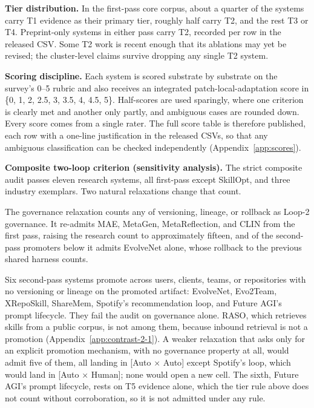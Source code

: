 \documentclass[
  11pt,
]{article}
\newcounter{none} %
\begin{document}
\textbf{Tier distribution.} In the first-pass core corpus, about a quarter of the systems carry T1 evidence as their primary tier, roughly half carry T2, and the rest T3 or T4. Preprint-only systems in either pass carry T2, recorded per row in the released CSV. Some T2 work is recent enough that its ablations may yet be revised; the cluster-level claims survive dropping any single T2 system.

\textbf{Scoring discipline.} Each system is scored substrate by substrate on the survey's 0--5 rubric and also receives an integrated patch-local-adaptation score in \{0, 1, 2, 2.5, 3, 3.5, 4, 4.5, 5\}. Half-scores are used sparingly, where one criterion is clearly met and another only partly, and ambiguous cases are rounded down. Every score comes from a single rater. The full score table is therefore published, each row with a one-line justification in the released CSVs, so that any ambiguous classification can be checked independently (Appendix~\ref{app:scores}).

\textbf{Composite two-loop criterion (sensitivity analysis).} The strict composite audit passes eleven research systems, all first-pass except SkillOpt, and three industry exemplars. Two natural relaxations change that count.

The governance relaxation counts any of versioning, lineage, or rollback as Loop-2 governance. It re-admits MAE, MetaGen, MetaReflection, and CLIN from the first pass, raising the research count to approximately fifteen, and of the second-pass promoters below it admits EvolveNet alone, whose rollback to the previous shared harness counts.

Six second-pass systems promote across users, clients, teams, or repositories with no versioning or lineage on the promoted artifact: EvolveNet, Evo2Team, XRepoSkill, ShareMem, Spotify's recommendation loop, and Future AGI's prompt lifecycle. They fail the audit on governance alone. RASO, which retrieves skills from a public corpus, is not among them, because inbound retrieval is not a promotion (Appendix~\ref{app:contrast-2-1}). A weaker relaxation that asks only for an explicit promotion mechanism, with no governance property at all, would admit five of them, all landing in {[}Auto × Auto{]} except Spotify's loop, which would land in {[}Auto × Human{]}; none would open a new cell. The sixth, Future AGI's prompt lifecycle, rests on T5 evidence alone, which the tier rule above does not count without corroboration, so it is not admitted under any rule.
\end{document}
